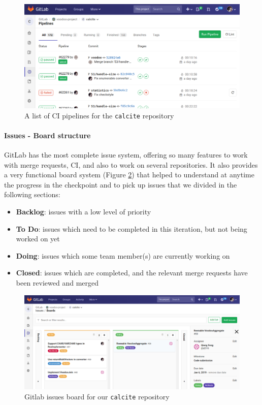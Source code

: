 \begin{figure}[h]
    \centering
    \includegraphics[width=0.98\linewidth, trim={0 0 6cm 7cm}, clip]{project-management/pipeline.png}
    \caption{A list of CI pipelines for the \texttt{calcite} repository}
    \label{fig:calcite-pipeline}
\end{figure}

\paragraph{Issues - Board structure}
GitLab has the most complete issue system, offering so many features to work with merge requests, CI, and also to work on several repositories. It also provides a very functional board system (Figure \ref{fig:gitlab-issues}) that helped to understand at anytime the progress in the checkpoint and to pick up issues that we divided in the following sections:

\begin{itemize}\itemsep0.2em
    \item \textbf{Backlog}: issues with a low level of priority
    \item \textbf{To Do}: issues which need to be completed in this iteration, but not being worked on yet
    \item \textbf{Doing}: issues which some team member(s) are currently working on
    \item \textbf{Closed}: issues which are completed, and the relevant merge requests have been reviewed and merged
\end{itemize}

\begin{figure}[h]
    \centering
    \includegraphics[width=0.98\linewidth, trim={0 0 0 7cm}, clip]{project-management/gitlab-issues.png}
    \caption{Gitlab issues board for our \texttt{calcite} repository}
    \label{fig:gitlab-issues}
\end{figure}

